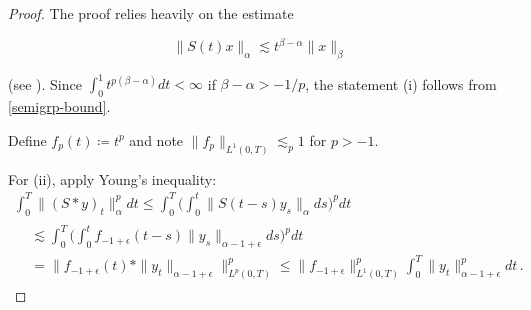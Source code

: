 \documentclass[final]{amsart}
\numberwithin{thm}{section}
\numberwithin{equation}{section}
\begin{document}
\begin{proof}
    The proof relies heavily on the estimate
    
    
    
    
    
    
    \begin{equation}\label{semigrp-bound}
        \|S(t)x\|_\alpha \lesssim t^{\beta - \alpha}\|x\|_\beta
    \end{equation}
    
    (see \cite[Exercise 5.41]{hairer-notes}).    Since $\int_0^1 t^{p(\beta - \alpha)}dt < \infty$ if $\beta - \alpha > -1/p$, the statement (i) follows from \eqref{semigrp-bound}.

        
    
    
    
    
    
    Define $f_p(t) \coloneqq t^p$ and note $\|f_p\|_{L^1(0,T)} \lesssim_p 1$ for $p > -1$.
    
    For (ii), apply Young's inequality:
    \begin{multline*}
        \int_0^T \|(S * y)_t\|^p_\alpha dt \leq \int_0^T \Big(\int_0^t \|S(t-s)y_s\|_\alpha ds\Big)^pdt \\
        \begin{aligned}
        &\lesssim \int_0^T \Big(\int_0^t f_{-1+\epsilon}(t-s)\|y_s\|_{\alpha - 1 + \epsilon} ds\Big)^pdt \\
        &= \Big\|f_{-1+\epsilon}(t) *\|y_t\|_{\alpha - 1 + \epsilon}\Big\|^p_{L^p(0,T)} \leq \|f_{-1+\epsilon}\|_{L^1(0,T)}^p \int_0^T \|y_t\|^p_{\alpha - 1 + \epsilon} dt \,.
    \end{aligned}
    \end{multline*}


\end{proof}
\end{document}
